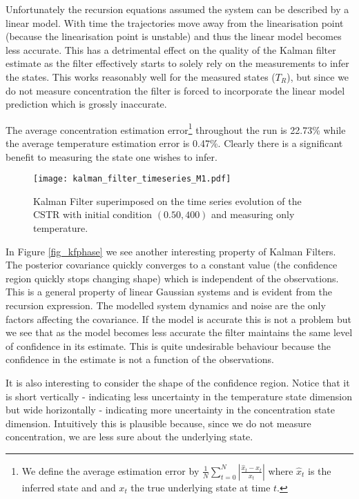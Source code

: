 Unfortunately the recursion equations assumed the system can be described by a linear model. With time the trajectories move away from the linearisation point (because the linearisation point is unstable) and thus the linear model becomes less accurate. This has a detrimental effect on the quality of the Kalman filter estimate as the filter effectively starts to solely rely on the measurements to infer the states. This works reasonably well for the measured states ($T_R$), but since we do not measure concentration the filter is forced to incorporate the linear model prediction which is grossly inaccurate. 

The average concentration estimation error\footnote{We define the average estimation error by $\frac{1}{N}\sum^N_{t=0}|\frac{\hat{x}_t-x_t}{x_t}|$ where $\hat{x}_t$ is the inferred state and and $x_t$ the true underlying state at time $t$.} throughout the run is 22.73\% while the average temperature estimation error is 0.47\%. Clearly there is a significant benefit to measuring the state one wishes to infer. 
\begin{figure}[H] 
\centering
\texttt{[image: kalman\_filter\_timeseries\_M1.pdf]}
\caption{Kalman Filter superimposed on the time series evolution of the CSTR with initial condition $(0.50, 400)$ and measuring only temperature.}
\label{fig_kftimeseries}
\end{figure}
In Figure \ref{fig_kfphase} we see another interesting property of Kalman Filters. The posterior covariance quickly converges to a constant value (the confidence region quickly stops changing shape) which is independent of the observations. This is a general property of linear Gaussian systems \cite{barber} and is evident from the recursion expression. The modelled system dynamics and noise are the only factors affecting the covariance. If the model is accurate this is not a problem but we see that as the model becomes less accurate the filter maintains the same level of confidence in its estimate. This is quite undesirable behaviour because the confidence in the estimate is not a function of the observations. 

It is also interesting to consider the shape of the confidence region. Notice that it is short vertically - indicating less uncertainty in the temperature state dimension but wide horizontally - indicating more uncertainty in the concentration state dimension. Intuitively this is plausible because, since we do not measure concentration, we are less sure about the underlying state. 

